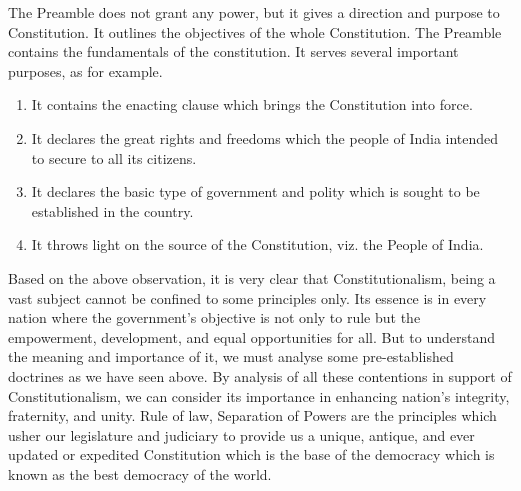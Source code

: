 \begin{multicols}{2}
\noi
The Preamble does not grant any power, but it gives a direction and purpose to Constitution. It
outlines the objectives of the whole Constitution. The Preamble contains the fundamentals of the
constitution. It serves several important purposes, as for example.

\vspace{-.3cm}

\begin{enumerate}
\itemsep=0pt

\item[(1)] It contains the enacting clause which brings the Constitution into force.

\item[(2)] It declares the great rights and freedoms which the people of India intended to secure to all its
citizens.

\item[(3)] It declares the basic type of government and polity which is sought to be established in the
country.

\item[(4)] It throws light on the source of the Constitution, viz. the People of India. 
\end{enumerate}

\vspace{-.3cm}


\noi
Based on the above observation, it is very clear that Constitutionalism, being a vast subject cannot
be confined to some principles only. Its essence is in every nation where the government's
objective is not only to rule but the empowerment, development, and equal opportunities for all.
But to understand the meaning and importance of it, we must analyse some pre-established
doctrines as we have seen above. By analysis of all these contentions in support of
Constitutionalism, we can consider its importance in enhancing nation's integrity, fraternity, and
unity. Rule of law, Separation of Powers are the principles which usher our legislature and
judiciary to provide us a unique, antique, and ever updated or expedited Constitution which is the
base of the democracy which is known as the best democracy of the world.
\end{multicols}
\label{end2018-art4}
